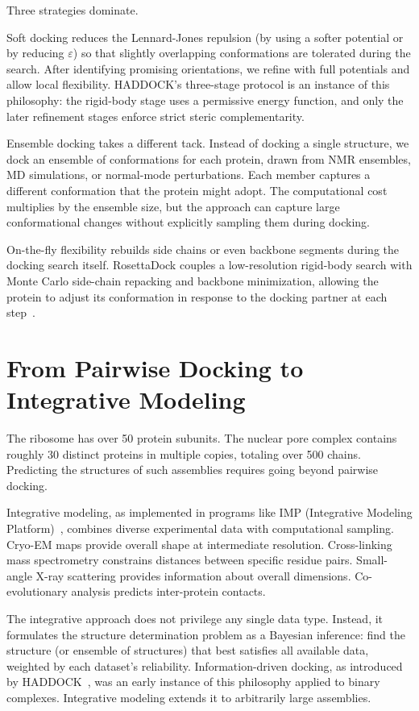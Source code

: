 Three strategies dominate.

Soft docking reduces the Lennard-Jones repulsion (by using a softer potential or by reducing $\varepsilon$) so that slightly overlapping conformations are tolerated during the search.  After identifying promising orientations, we refine with full potentials and allow local flexibility.  HADDOCK's three-stage protocol is an instance of this philosophy: the rigid-body stage uses a permissive energy function, and only the later refinement stages enforce strict steric complementarity.

Ensemble docking takes a different tack.  Instead of docking a single structure, we dock an ensemble of conformations for each protein, drawn from NMR ensembles, MD simulations, or normal-mode perturbations.  Each member captures a different conformation that the protein might adopt.  The computational cost multiplies by the ensemble size, but the approach can capture large conformational changes without explicitly sampling them during docking.

On-the-fly flexibility rebuilds side chains or even backbone segments during the docking search itself.  RosettaDock couples a low-resolution rigid-body search with Monte Carlo side-chain repacking and backbone minimization, allowing the protein to adjust its conformation in response to the docking partner at each step~\cite{gray2003}.

\section{From Pairwise Docking to Integrative Modeling}
\label{sec:integrative}

The ribosome has over 50 protein subunits.
The nuclear pore complex contains roughly 30 distinct proteins in multiple copies, totaling over 500 chains.
Predicting the structures of such assemblies requires going beyond pairwise docking.

Integrative modeling, as implemented in programs like IMP (Integrative Modeling Platform)~\cite{russel2012}, combines diverse experimental data with computational sampling.
Cryo-EM maps provide overall shape at intermediate resolution.
Cross-linking mass spectrometry constrains distances between specific residue pairs.
Small-angle X-ray scattering provides information about overall dimensions.
Co-evolutionary analysis predicts inter-protein contacts.

The integrative approach does not privilege any single data type.
Instead, it formulates the structure determination problem as a Bayesian inference: find the structure (or ensemble of structures) that best satisfies all available data, weighted by each dataset's reliability.
Information-driven docking, as introduced by HADDOCK~\cite{dominguez2003}, was an early instance of this philosophy applied to binary complexes.
Integrative modeling extends it to arbitrarily large assemblies.

